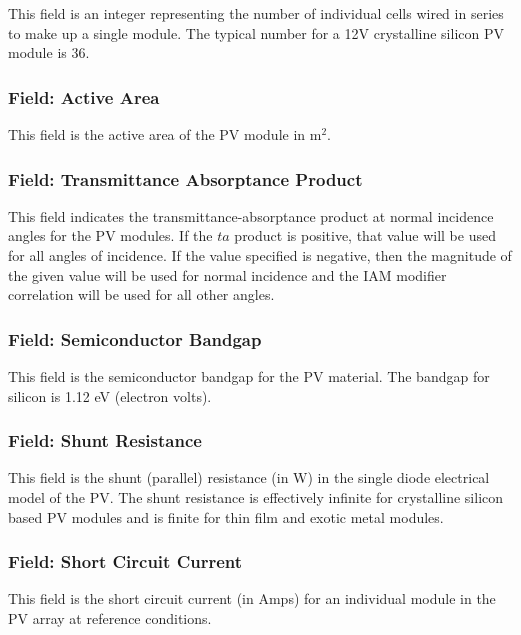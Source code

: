 This field is an integer representing the number of individual cells wired in series to make up a single module. The typical number for a 12V crystalline silicon PV module is 36.

\subsubsection{Field: Active Area}\label{field-active-area}

This field is the active area of the PV module in m\(^{2}\).

\subsubsection{Field: Transmittance Absorptance Product}\label{field-transmittance-absorptance-product}

This field indicates the transmittance-absorptance product at normal incidence angles for the PV modules. If the $ta$ product is positive, that value will be used for all angles of incidence. If the value specified is negative, then the magnitude of the given value will be used for normal incidence and the IAM modifier correlation will be used for all other angles.

\subsubsection{Field: Semiconductor Bandgap}\label{field-semiconductor-bandgap}

This field is the semiconductor bandgap for the PV material. The bandgap for silicon is 1.12 eV (electron volts).

\subsubsection{Field: Shunt Resistance}\label{field-shunt-resistance}

This field is the shunt (parallel) resistance (in W) in the single diode electrical model of the PV. The shunt resistance is effectively infinite for crystalline silicon based PV modules and is finite for thin film and exotic metal modules.

\subsubsection{Field: Short Circuit Current}\label{field-short-circuit-current}

This field is the short circuit current (in Amps) for an individual module in the PV array at reference conditions.

